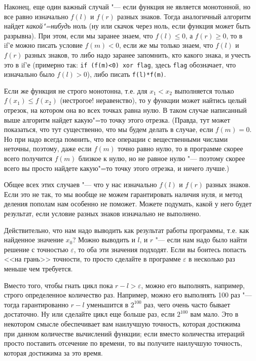\documentclass[a4paper,10pt]{problems}
\let\eps\varepsilon
\begin{document}
Наконец, еще один важный случай "--- если функция не является монотонной, но все равно изначально $f(l)$ и $f(r)$ разных знаков. 
Тогда аналогичный алгоритм найдет \textit{какой"=нибудь} ноль (ну или скачок через ноль, если функция может быть разрывна).
При этом, если мы заранее знаем, что $f(l)\leq 0$, а $f(r)\geq 0$, то в if'е можно писать условие $f(m)<0$, 
если же мы только знаем, что $f(l)$ и $f(r)$ разных знаков, то либо надо заранее запомнить, кто какого знака, 
и учесть это в if'е (примерно так: \verb`if (f(m)<0) xor flag`, здесь \verb`flag` обозначает, что изначально было $f(l)>0$), 
либо писать \verb`f(l)*f(m)`.

Если же функция не строго монотонна, т.е. для $x_1<x_2$ выполняется только $f(x_1)\leq f(x_2)$ 
(нестрогое! неравенство), то у функции может найтись целый отрезок, на котором она во всех точках равна нулю.
В таком случае написанный выше алгоритм найдет какую"=то точку этого отрезка.
(Правда, тут может показаться, что тут существенно, что мы будем делать в случае, если $f(m)=0$. 
Но при надо всегда помнить, что все операции с вещественными числами неточны, поэтому, даже если $f(m)$ точно равно нулю,
то в программе скорее всего получится $f(m)$ близкое к нулю, но не равное нулю
"--- поэтому скорее всего вы просто найдете какую"=то точку этого отрезка, и ничего лучше.)

Общее всех этих случаев "--- что у нас изначально $f(l)$ и $f(r)$ разных знаков. 
Если это не так, то мы вообще не можем гарантировать наличия нуля, и метод деления пополам нам особенно не поможет.
Можете подумать, какой у него будет результат, если условие разных знаков изначально не выполнено.

 Действительно, что нам надо выводить как результат работы программы, т.е. как найденное значение $x_0$?
Можно выводить и $l$, и $r$ "--- если нам надо было найти решение с точностью $\eps$, то оба эти значения подходят.
Если вы боитесь попасть <<на грань>> точности, то просто сделайте в программе $\eps$ в несколько раз меньше чем требуется.


\lheader{Решение без $\eps$} Вместо того, чтобы гнать цикл пока $r-l>\eps$, можно его выполнять, например, строго определенное количество раз.
Например, можно его выполнять 100 раз "--- тогда гарантированно $r-l$ уменьшится в $2^{100}$ раз, чего очень часто бывает достаточно.
Ну или сделайте цикл еще больше раз, если $2^{100}$ вам мало. 
Это в некотором смысле обеспечивает вам наилучшую точность, которая достижима при данном количестве вычислений функции;
если вместо количества итераций просто поставить отсечение по времени, то вы получите наилучшую точность, которая достижима за это время.
\end{document}
